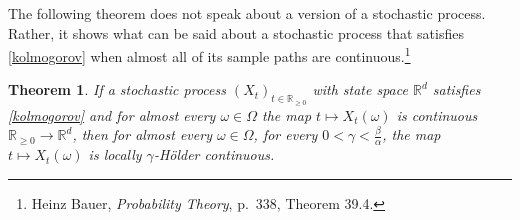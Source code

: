 \documentclass{article}
\newtheorem{theorem}{Theorem}
\theoremstyle{definition}
\begin{document}
The following theorem does not speak about a version of a stochastic process. Rather, it shows what can be said about a stochastic
process that satisfies \eqref{kolmogorov} when almost all of its sample paths are continuous.\footnote{Heinz Bauer, {\em Probability Theory}, p.~338, Theorem 39.4.}

\begin{theorem}
If a stochastic process $(X_t)_{t \in \mathbb{R}_{\geq 0}}$ with state space $\mathbb{R}^d$ satisfies \eqref{kolmogorov} and for almost every
$\omega \in \Omega$ the map $t \mapsto X_t(\omega)$ is continuous $\mathbb{R}_{\geq 0} \to \mathbb{R}^d$, then
for almost every $\omega \in \Omega$, 
for  every $0<\gamma<\frac{\beta}{\alpha}$,
the map $t \mapsto X_t(\omega)$ is  locally 
$\gamma$-H\"older continuous.
\label{holder}
\end{theorem}
\end{document}
